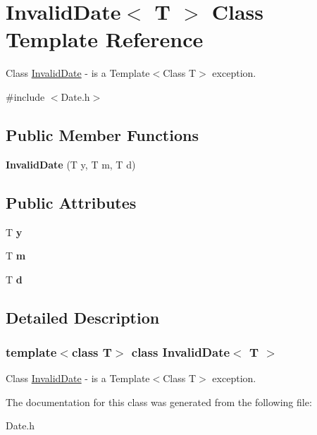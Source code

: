 \hypertarget{class_invalid_date}{}\section{Invalid\+Date$<$ T $>$ Class Template Reference}
\label{class_invalid_date}


Class \hyperlink{class_invalid_date}{Invalid\+Date} -\/ is a Template$<$\+Class T$>$ exception.  




{\ttfamily \#include $<$Date.\+h$>$}

\subsection*{Public Member Functions}
\begin{DoxyCompactItemize}
\item 
\mbox{\label{class_invalid_date_a3fbe382d9f0ecc3c5b5bef64a0785877}} 
{\bfseries Invalid\+Date} (T y, T m, T d)
\end{DoxyCompactItemize}
\subsection*{Public Attributes}
\begin{DoxyCompactItemize}
\item 
\mbox{\label{class_invalid_date_a1276ebe79fcc1f25434ab418f6574aa6}} 
T {\bfseries y}
\item 
\mbox{\label{class_invalid_date_a662c67e855454c7b3b5f334e711b41a2}} 
T {\bfseries m}
\item 
\mbox{\label{class_invalid_date_a902305bd651bb3e30d6e7c2cd5d1f247}} 
T {\bfseries d}
\end{DoxyCompactItemize}


\subsection{Detailed Description}
\subsubsection*{template$<$class T$>$\newline
class Invalid\+Date$<$ T $>$}

Class \hyperlink{class_invalid_date}{Invalid\+Date} -\/ is a Template$<$\+Class T$>$ exception. 

The documentation for this class was generated from the following file\+:\begin{DoxyCompactItemize}
\item 
Date.\+h\end{DoxyCompactItemize}
